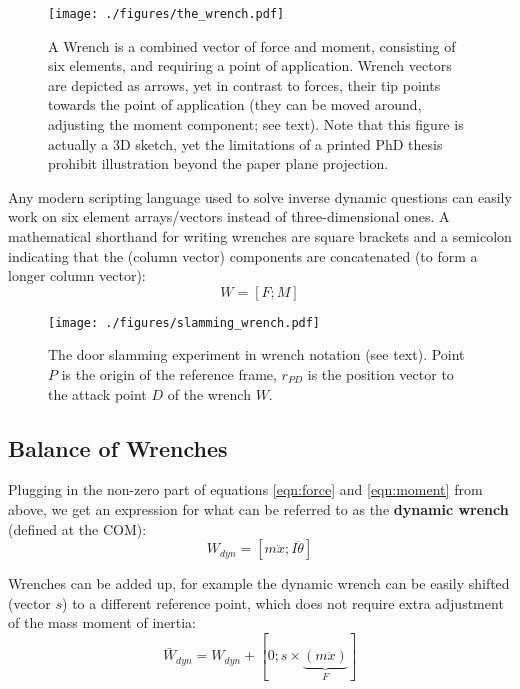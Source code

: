 \documentclass[10pt,a4paper]{article}
\begin{document}
\begin{figure}[p]
\centering
\texttt{[image: ./figures/the\_wrench.pdf]}
\caption{\label{fig:wrench}A Wrench is a combined vector of force and moment, consisting of six elements, and requiring a point of application. Wrench vectors are depicted as arrows, yet in contrast to forces, their tip points towards the point of application (they can be moved around, adjusting the moment component; see text). Note that this figure is actually a 3D sketch, yet the limitations of a printed PhD thesis prohibit illustration beyond the paper plane projection.}
\end{figure}


Any modern scripting language used to solve inverse dynamic questions can easily work on six element arrays/vectors instead of three-dimensional ones.
A mathematical shorthand for writing wrenches are square brackets and a semicolon indicating that the (column vector) components are concatenated (to form a longer column vector):
\[W = \left[ F; M \right]\]

\begin{figure}[p]
\centering
\texttt{[image: ./figures/slamming\_wrench.pdf]}
\caption{\label{fig:slamming_wrench}The door slamming experiment in wrench notation (see text). Point \(P\) is the origin of the reference frame, \(r_{PD}\) is the position vector to the attack point \(D\) of the wrench \(W\).}
\end{figure}


\FloatBarrier
\subsection{Balance of Wrenches}
\label{sec:orga0bbdcb}
Plugging in the non-zero part of equations \eqref{eqn:force} and \eqref{eqn:moment} from above, we get an expression for what can be referred to as the \textbf{dynamic wrench} (defined at the COM):
\begin{equation}\label{eqn:dynamic_wrench}
W_{dyn} = \left[ m\ddot x; I\ddot \theta \right]
\end{equation}

Wrenches can be added up, for example the dynamic wrench can be easily shifted (vector \(s\)) to a different reference point, which does not require extra adjustment of the mass moment of inertia:
\begin{equation}\label{eqn:shift_wrench}
\bar W_{dyn} = W_{dyn} + [ 0; s \times \underbrace{(m\ddot x)}_{F} ]
\end{equation}
\end{document}
